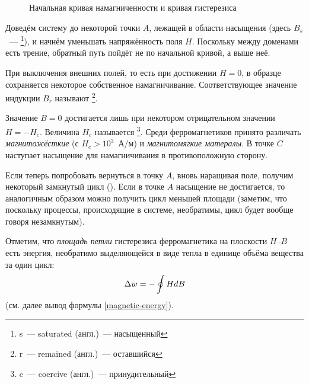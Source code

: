 \begin{wrapfigure}{r}{0.4\textwidth}
    \caption{Начальная кривая намагниченности и кривая гистерезиса}
\end{wrapfigure}

Доведём систему до некоторой точки $A$, лежащей в области
насыщения (здесь $B_s$~--- \footnote[1]{s~--- saturated
(англ.)~--- насыщенный}), и начнём уменьшать напряжённость поля $H$.
Поскольку между доменами есть трение, обратный путь
пойдёт не по начальной кривой, а выше неё.

При выключения внешних полей, то есть при достижении $H = 0$,
в образце сохраняется некоторое собственное намагничивание.
Соответствующее значение индукции $B_r$
называют \footnote[2]{r~--- remained (англ.)~--- оставшийся}.

Значение $B = 0$ достигается лишь при некотором отрицательном значении
$H = - H_c$. Величина $H_c$ называется
\footnote[3]{c~--- coercive (англ.)~--- принудительный}.
Среди ферромагнетиков принято различать \emph{магнитожёсткие}
(с $H_c > 10^3$~А/м) и \emph{магнитомягкие матералы}. В точке $C$
наступает насыщение для намагничивания в противоположную сторону.

Если теперь попробовать вернуться в точку $A$, вновь наращивая поле,
получим некоторый замкнутый цикл (). Если
в точке $A$ насыщение не достигается, то аналогичным образом можно получить
цикл меньшей площади (заметим, что поскольку процессы, происходящие
в системе, необратимы, цикл будет вообще говоря незамкнутым).

Отметим, что \emph{площадь петли} гистерезиса ферромагнетика на плоскости
$H$--$B$ есть энергия, необратимо выделяющейся в виде тепла в единице
объёма вещества за один цикл:
\begin{equation}
    \eqmark{HdB}
    \Delta w = -\oint {HdB}
\end{equation}
(см. далее вывод формулы \eqref{magnetic-energy}).

%


